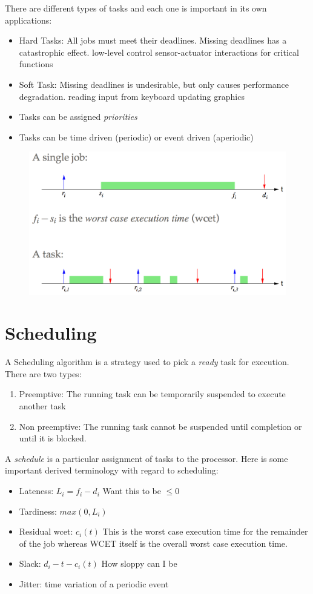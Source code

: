 \documentclass{hw}
\begin{document}
There are different types of tasks and each one is important in its own
applications:
\begin{itemize}
  \item Hard Tasks: All jobs must meet their deadlines. Missing deadlines has 
    a catastrophic effect.
    \subitem low-level control
    \subitem sensor-actuator interactions for critical functions
  \item Soft Task: Missing deadlines is undesirable, but only causes performance
    degradation.
    \subitem reading input from keyboard
    \subitem updating graphics
  \item Tasks can be assigned \emph{priorities}
  \item Tasks can be time driven (periodic) or event driven (aperiodic)
\end{itemize}

\begin{figure}[H]
  \centering
  \includegraphics[scale=.5]{jobtask}
\end{figure}

\section{Scheduling}
A Scheduling algorithm is a strategy used to pick a \emph{ready} task for 
execution. There are two types:
\begin{enumerate}
  \item Preemptive: The running task can be temporarily suspended to execute 
    another task
  \item Non preemptive: The running task cannot be suspended until completion or
    until it is blocked.
\end{enumerate}
A \emph{schedule} is a particular assignment of tasks to the processor. Here is 
some important derived terminology with regard to scheduling:
\begin{itemize}
  \item Lateness: $L_{i} = f_{i} - d_{i} $ Want this to be $\leq 0$
  \item Tardiness: $max(0,L_{i})$
  \item Residual wcet: $c_{i}(t)$ This is the worst case execution time for the
    remainder of the job whereas WCET itself is the overall worst case
    execution time.
  \item Slack: $d_{i} - t - c_{i}(t)$  How sloppy can I be
  \item Jitter: time variation of a periodic event
\end{itemize}
\end{document}
